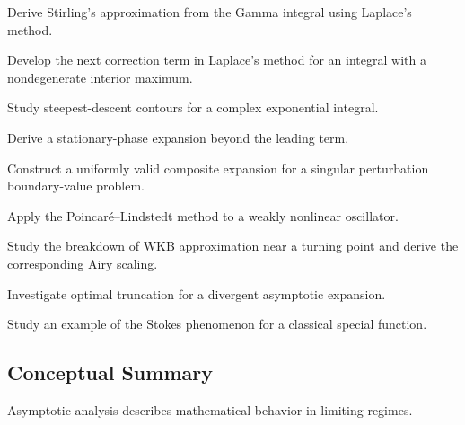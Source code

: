 \begin{exercise}[4]
Derive Stirling's approximation from the Gamma integral using Laplace's
method.
\end{exercise}

\begin{exercise}[4]
Develop the next correction term in Laplace's method for an integral with
a nondegenerate interior maximum.
\end{exercise}

\begin{exercise}[4]
Study steepest-descent contours for a complex exponential integral.
\end{exercise}

\begin{exercise}[4]
Derive a stationary-phase expansion beyond the leading term.
\end{exercise}

\begin{exercise}[4]
Construct a uniformly valid composite expansion for a singular
perturbation boundary-value problem.
\end{exercise}

\begin{exercise}[4]
Apply the Poincar\'e--Lindstedt method to a weakly nonlinear oscillator.
\end{exercise}

\begin{exercise}[4]
Study the breakdown of WKB approximation near a turning point and derive
the corresponding Airy scaling.
\end{exercise}

\begin{exercise}[4]
Investigate optimal truncation for a divergent asymptotic expansion.
\end{exercise}

\begin{exercise}[4]
Study an example of the Stokes phenomenon for a classical special
function.
\end{exercise}

\subsection{Conceptual Summary}
\label{subsec:asymptotic-analysis-summary}

Asymptotic analysis describes mathematical behavior in limiting regimes.

